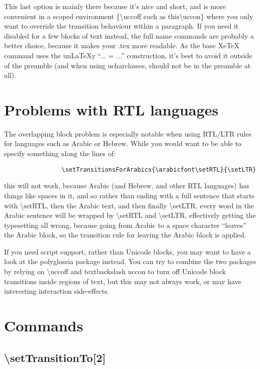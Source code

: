 ﻿\documentclass{article}
\begin{document}
			This last option is mainly there because it's nice and short, and is more convenient in a scoped environment \{\textbackslash uccoff such as this\textbackslash uccon\} where you only want to override the transition behaviour within a paragraph. If you need it disabled for a few blocks of text instead, the full name commands are probably a better choice, because it makes your .tex more readable. As the base XeTeX command uses the un\LaTeX y “... = ...” construction, it's best to avoid it outside of the preamble (and when using ucharclasses, should not be in the preamble at all).

	\section{Problems with RTL languages}

		The overlapping block problem is especially notable when using RTL/LTR rules for languages such as Arabic or Hebrew. While you would want to be able to specify something along the lines of:

		\begin{verbatim}
				\setTransitionsForArabics{\arabicfont\setRTL}{\setLTR}
		\end{verbatim}

		this will not work, because Arabic (and Hebrew, and other RTL languages) has things like spaces in it, and so rather than ending with a full sentence that starts with \textbackslash setRTL, then the Arabic text, and then finally \textbackslash setLTR, every word in the Arabic sentence will be wrapped by \textbackslash setRTL and \textbackslash setLTR, effectively getting the typesetting all wrong, because going from Arabic to a space character “leaves” the Arabic block, so the transition rule for leaving the Arabic block is applied.

		If you need script support, rather than Unicode blocks, you may want to have a look at the polyglossia package instead. You can try to combine the two packages by relying on \textbackslash uccoff and textbackslash uccon to turn off Unicode block transitions inside regions of text, but this may not always work, or may have interesting interaction side-effects.

	\section{Commands}

		\subsection{\textbackslash setTransitionTo[2]}
\end{document}
